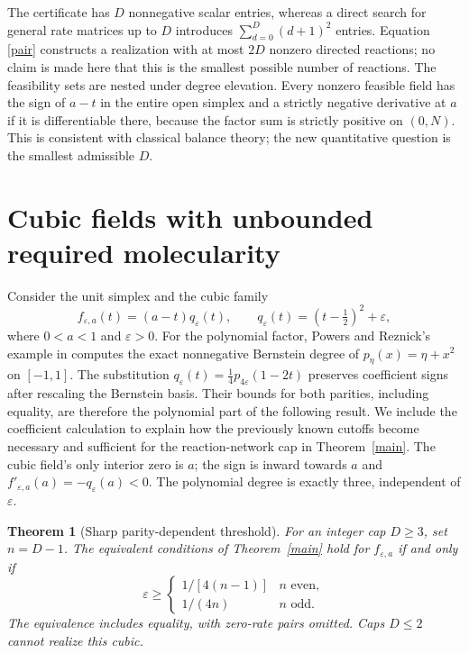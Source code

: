 \documentclass[11pt]{article}
\newtheorem{theorem}{Theorem}[section]
\begin{document}
The certificate has $D$ nonnegative scalar entries, whereas a direct search for general rate matrices up to $D$ introduces $\sum_{d=0}^D(d+1)^2$ entries. Equation \eqref{pair} constructs a realization with at most $2D$ nonzero directed reactions; no claim is made here that this is the smallest possible number of reactions. The feasibility sets are nested under degree elevation. Every nonzero feasible field has the sign of $a-t$ in the entire open simplex and a strictly negative derivative at $a$ if it is differentiable there, because the factor sum is strictly positive on $(0,N)$. This is consistent with classical balance theory; the new quantitative question is the smallest admissible $D$.

\section{Cubic fields with unbounded required molecularity}
Consider the unit simplex and the cubic family
\begin{equation}\label{cubic}
f_{\varepsilon,a}(t)=(a-t)q_\varepsilon(t),\qquad q_\varepsilon(t)=(t-\tfrac12)^2+\varepsilon,
\end{equation}
where $0<a<1$ and $\varepsilon>0$. For the polynomial factor, Powers and Reznick's example in \cite[Section~3, pp.~4684--4685]{powersreznick2000} computes the exact nonnegative Bernstein degree of $p_\eta(x)=\eta+x^2$ on $[-1,1]$. The substitution $q_\varepsilon(t)=\tfrac14 p_{4\varepsilon}(1-2t)$ preserves coefficient signs after rescaling the Bernstein basis. Their bounds for both parities, including equality, are therefore the polynomial part of the following result. We include the coefficient calculation to explain how the previously known cutoffs become necessary and sufficient for the reaction-network cap in Theorem~\ref{main}. The cubic field's only interior zero is $a$; the sign is inward towards $a$ and $f'_{\varepsilon,a}(a)=-q_\varepsilon(a)<0$. The polynomial degree is exactly three, independent of $\varepsilon$.
\begin{theorem}[Sharp parity-dependent threshold]\label{sharp}
For an integer cap $D\geq3$, set $n=D-1$. The equivalent conditions of Theorem~\ref{main} hold for $f_{\varepsilon,a}$ if and only if
\begin{equation}\label{threshold}
\varepsilon\geq \begin{cases}1/[4(n-1)]& n\text{ even},\\1/(4n)&n\text{ odd}.\end{cases}
\end{equation}
The equivalence includes equality, with zero-rate pairs omitted. Caps $D\leq2$ cannot realize this cubic.
\end{theorem}
\end{document}
